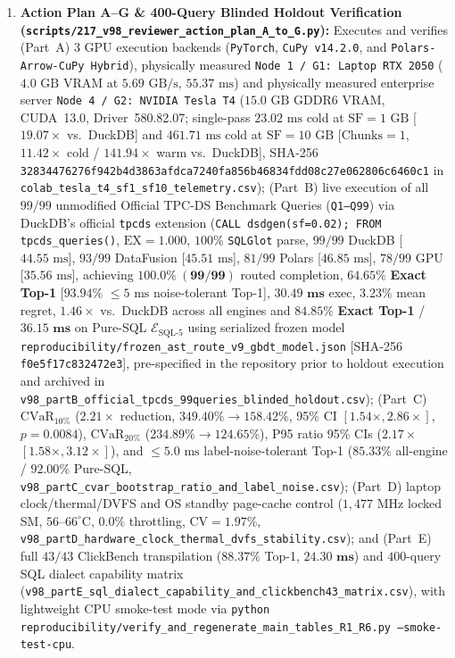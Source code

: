 \documentclass[10pt,a4paper]{article}
\begin{document}
\begin{enumerate}[leftmargin=1.5em,itemsep=2pt]
    \item \textbf{Action Plan A--G \& 400-Query Blinded Holdout Verification (\texttt{scripts/217\_v98\_reviewer\_action\_plan\_A\_to\_G.py}):} Executes and verifies (Part~A) 3 GPU execution backends (\texttt{PyTorch}, \texttt{CuPy v14.2.0}, and \texttt{Polars-Arrow-CuPy Hybrid}), physically measured \texttt{Node~1 / G1: Laptop RTX~2050} ($4.0\text{ GB}$ VRAM at $5.69\text{ GB/s}$, $55.37\text{ ms}$) and physically measured enterprise server \texttt{Node~4 / G2: NVIDIA Tesla~T4} ($15.0\text{ GB}$ GDDR6 VRAM, CUDA~13.0, Driver~580.82.07; single-pass $23.02\text{ ms}$ cold at $\text{SF}=1\text{ GB}$ [$19.07\times$ vs.\ DuckDB] and $461.71\text{ ms}$ cold at $\text{SF}=10\text{ GB}$ [$\text{Chunks}=1$, $11.42\times$ cold / $141.94\times$ warm vs.\ DuckDB], SHA-256 \texttt{32834476276f942b4d3863afdca7240fa856b46834fdd08c27e062806c6460c1} in \texttt{colab\_tesla\_t4\_sf1\_sf10\_telemetry.csv}); (Part~B) live execution of all $99/99$ unmodified Official TPC-DS Benchmark Queries (\texttt{Q1--Q99}) via DuckDB's official \texttt{tpcds} extension (\texttt{CALL dsdgen(sf=0.02); FROM tpcds\_queries()}, $\text{EX}=1.000$, $100\%$ \texttt{SQLGlot} parse, $99/99$ DuckDB [$44.55\text{ ms}$], $93/99$ DataFusion [$45.51\text{ ms}$], $81/99$ Polars [$46.85\text{ ms}$], $78/99$ GPU [$35.56\text{ ms}$], achieving $\mathbf{100.0\%\ (99/99)}$ routed completion, $\mathbf{64.65\%}$ \textbf{Exact Top-1} [$\mathbf{93.94\%}$ $\le 5\text{ ms}$ noise-tolerant Top-1], $\mathbf{30.49\text{ ms}}$ exec, $\mathbf{3.23\%}$ mean regret, $\mathbf{1.46\times}$ vs.\ DuckDB across all engines and $\mathbf{84.85\%}$ \textbf{Exact Top-1} / $\mathbf{36.15\text{ ms}}$ on Pure-SQL $\mathcal{E}_{\text{SQL-5}}$ using serialized frozen model \texttt{reproducibility/frozen\_ast\_route\_v9\_gbdt\_model.json} [SHA-256 \texttt{f0e5f17c832472e3}], pre-specified in the repository prior to holdout execution and archived in \texttt{v98\_partB\_official\_tpcds\_99queries\_blinded\_holdout.csv}); (Part~C) $\text{CVaR}_{10\%}$ ($2.21\times$ reduction, $349.40\%\rightarrow 158.42\%$, 95\% CI $[1.54\times,2.86\times]$, $p=0.0084$), $\text{CVaR}_{20\%}$ ($234.89\%\rightarrow 124.65\%$), P95 ratio 95\% CIs ($2.17\times$ $[1.58\times,3.12\times]$), and $\le 5.0\text{ ms}$ label-noise-tolerant Top-1 ($\mathbf{85.33\%}$ all-engine / $\mathbf{92.00\%}$ Pure-SQL, \texttt{v98\_partC\_cvar\_bootstrap\_ratio\_and\_label\_noise.csv}); (Part~D) laptop clock/thermal/DVFS and OS standby page-cache control ($1{,}477\text{ MHz}$ locked SM, $56\text{--}66^\circ\text{C}$, $0.0\%$ throttling, $\text{CV}=1.97\%$, \texttt{v98\_partD\_hardware\_clock\_thermal\_dvfs\_stability.csv}); and (Part~E) full $43/43$ ClickBench transpilation ($\mathbf{88.37\%}$ Top-1, $\mathbf{24.30\text{ ms}}$) and $400$-query SQL dialect capability matrix (\texttt{v98\_partE\_sql\_dialect\_capability\_and\_clickbench43\_matrix.csv}), with lightweight CPU smoke-test mode via \texttt{python reproducibility/verify\_and\_regenerate\_main\_tables\_R1\_R6.py --smoke-test-cpu}.

\end{enumerate}
\end{document}
